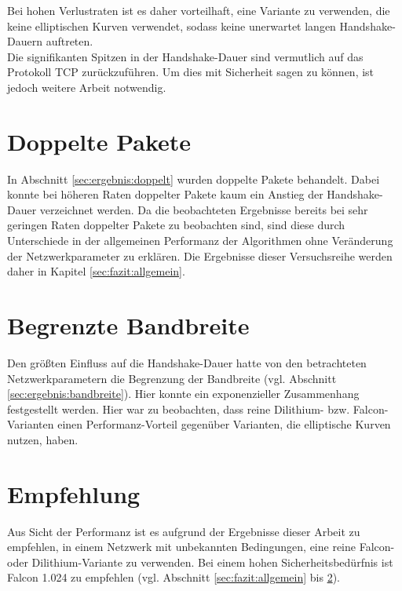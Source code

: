	Bei hohen Verlustraten ist es daher vorteilhaft, eine Variante zu verwenden, die keine elliptischen Kurven verwendet, sodass keine unerwartet langen Handshake-Dauern auftreten.\\
	
	Die signifikanten Spitzen in der Handshake-Dauer sind vermutlich auf das Protokoll TCP zurückzuführen. Um dies mit Sicherheit sagen zu können, ist jedoch weitere Arbeit notwendig.
	
	\section{Doppelte Pakete}
	\label{sec:fazit:doppelt}
	
	In Abschnitt \ref{sec:ergebnis:doppelt} wurden doppelte Pakete behandelt. Dabei konnte bei höheren Raten doppelter Pakete kaum ein Anstieg der Handshake-Dauer verzeichnet werden. Da die beobachteten Ergebnisse bereits bei sehr geringen Raten doppelter Pakete zu beobachten sind, sind diese durch Unterschiede in der allgemeinen Performanz der Algorithmen ohne Veränderung der Netzwerkparameter zu erklären. Die Ergebnisse dieser Versuchsreihe werden daher in Kapitel \ref{sec:fazit:allgemein}.
	
	\section{Begrenzte Bandbreite}
	\label{sec:fazit:bandbreite}
	
	Den größten Einfluss auf die Handshake-Dauer hatte von den betrachteten Netzwerkparametern die Begrenzung der Bandbreite (vgl. Abschnitt \ref{sec:ergebnis:bandbreite}). Hier konnte ein exponenzieller Zusammenhang festgestellt werden. Hier war zu beobachten, dass reine Dilithium- bzw. Falcon-Varianten einen Performanz-Vorteil gegenüber Varianten, die elliptische Kurven nutzen, haben.
	
	\section{Empfehlung}
	\label{sec:fazit:empfehlung}

	Aus Sicht der Performanz ist es aufgrund der Ergebnisse dieser Arbeit zu empfehlen, in einem Netzwerk mit unbekannten Bedingungen, eine reine Falcon- oder Dilithium-Variante zu verwenden. Bei einem hohen Sicherheitsbedürfnis ist Falcon 1.024 zu empfehlen (vgl. Abschnitt \ref{sec:fazit:allgemein} bis \ref{sec:fazit:bandbreite}).